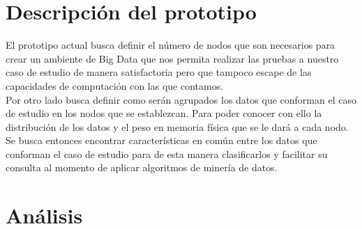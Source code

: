 \section{Descripción del prototipo} 
El prototipo actual busca definir el número de nodos que son necesarios para crear un ambiente de Big Data que nos permita realizar las pruebas a nuestro caso de estudio de manera satisfactoria pero que tampoco escape de las capacidades de computación con las que contamos.
\\
Por otro lado busca definir como serán agrupados los datos que conforman el caso de estudio en los nodos que se establezcan. Para poder conocer con ello la distribución de los datos y el peso en memoria física que se le dará a cada nodo.
\\
Se busca entonces encontrar características en común entre los datos que conforman el caso de estudio para de esta manera clasificarlos y facilitar su consulta al momento de aplicar algoritmos de minería de datos. 
\section{Análisis}
